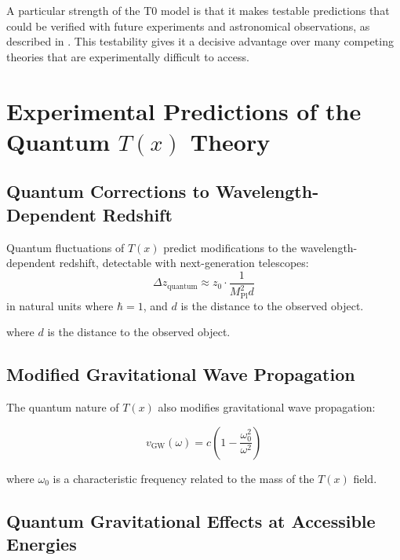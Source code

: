 \documentclass[12pt,a4paper]{article}
\newcommand{\Tfield}{T(x)}
\begin{document}
	\begin{tcolorbox}[colback=blue!5!white,colframe=blue!75!black,title=Advantage Over Competing Approaches]
		A particular strength of the T0 model is that it makes testable predictions that could be verified with future experiments and astronomical observations, as described in \cite{pascher_vereinheitlichung_2025_en}. This testability gives it a decisive advantage over many competing theories that are experimentally difficult to access.
	\end{tcolorbox}
	
	\section{Experimental Predictions of the Quantum $\Tfield$ Theory}
	\label{sec:experimentelle_vorhersagen}
	
	\subsection{Quantum Corrections to Wavelength-Dependent Redshift}
	\label{sec:quantenkorrekturen_rotverschiebung}
Quantum fluctuations of $\Tfield$ predict modifications to the wavelength-dependent redshift, detectable with next-generation telescopes:
\begin{equation}
	\Delta z_{\text{quantum}} \approx z_0 \cdot \frac{1}{M_{\text{Pl}}^2 d}
\end{equation}
in natural units where $\hbar = 1$, and $d$ is the distance to the observed object.

	
	where $d$ is the distance to the observed object.
	
	\subsection{Modified Gravitational Wave Propagation}
	\label{sec:gravitationswellen}
	
	The quantum nature of $\Tfield$ also modifies gravitational wave propagation:
	
	\begin{equation}
		v_{\text{GW}}(\omega) = c\left(1 - \frac{\omega_0^2}{\omega^2}\right)
	\end{equation}
	
	where $\omega_0$ is a characteristic frequency related to the mass of the $\Tfield$ field.
	
	\subsection{Quantum Gravitational Effects at Accessible Energies}
	\label{sec:quantengravitative_effekte}
	
\end{document}
